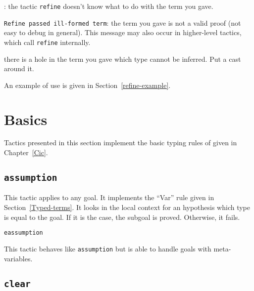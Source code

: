 \begin{ErrMsgs}
\item {}: 
  the tactic \texttt{refine} doesn't know what to do
  with the term you gave.
\item \texttt{Refine passed ill-formed term}: the term you gave is not
  a valid proof (not easy to debug in general).
  This message may also occur in higher-level tactics, which call 
  \texttt{refine} internally.
\item {}
  there is a hole in the term you gave
  which type cannot be inferred. Put a cast around it.
\end{ErrMsgs}

An example of use is given in Section~\ref{refine-example}.

\section{Basics
}

Tactics presented in this section implement the basic typing rules of
{\CIC} given in Chapter~\ref{Cic}.

\subsection{{\tt assumption}
}

This tactic applies to any goal. It implements the
``Var'' rule given in
Section~\ref{Typed-terms}. It looks in the local context for an
hypothesis which type is equal to the goal.  If it is the case, the
subgoal is proved. Otherwise, it fails.

\begin{ErrMsgs}
\item  {}
\end{ErrMsgs}

\begin{Variants}
  \item \texttt{eassumption}

    This tactic behaves like \texttt{assumption} but is able to handle
    goals with meta-variables.

\end{Variants}


\subsection{\tt clear {\ident}
\label{clear}}

